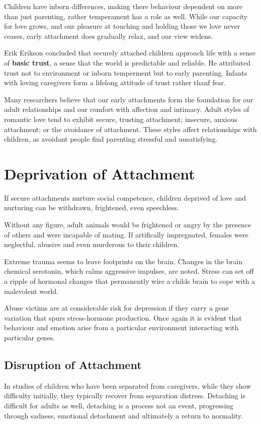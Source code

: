\documentclass[12pt]{article}
\begin{document}
Children have inborn differences, making there behaviour dependent on more than just parenting, rather temperament has a role as well. While our capacity for love grows, and our pleasure at touching and holding those we love never ceases, early attachment does gradually relax, and our view widens.

Erik Erikson concluded that securely attached children approach life with a sense of \textbf{basic trust}, a sense that the world is predictable and reliable. He attributed trust not to environment or inborn temperment but to early parenting. Infants with loving caregivers form a lifelong attitude of trust rather thanf fear.

Many researchers believe that our early attachments form the foundation for our adult relationships and our comfort with affection and intimacy. Adult styles of romantic love tend to exhibit secure, trusting attachment; insecure, anxious attachment; or the avoidance of attachment. These styles affect relationships with children, as avoidant people find parenting stressful and unsatisfying.

\section*{Deprivation of Attachment}
If secure attachments nurture social competence, children deprived of love and nurturing can be withdrawn, frightened, even speechless. 

Without any figure, adult animals would be frightened or angry by the presence of others and were incapable of mating. If artifically impregnated, females were neglectful, abusive and even murderous to their children.

Extreme trauma seems to leave footprints on the brain. Changes in the brain chemical serotonin, which calms aggressive impulses, are noted. Stress can set off a ripple of hormonal changes that permanently wire a childs brain to cope with a malevolent world. 

Abuse victims are at considerable risk for depression if they carry a gene variation that spurs stress-hormone production. Once again it is evident that behaviour and emotion arise from a particular environment interacting with particular genes.

\subsection*{Disruption of Attachment}
In studies of children who have been separated from caregivers, while they show difficulty initially, they typically recover from separation distress. Detaching is difficult for adults as well, detaching is a process not an event, progressing through sadness, emotional detachment and ultimately a return to normality.
\end{document}
